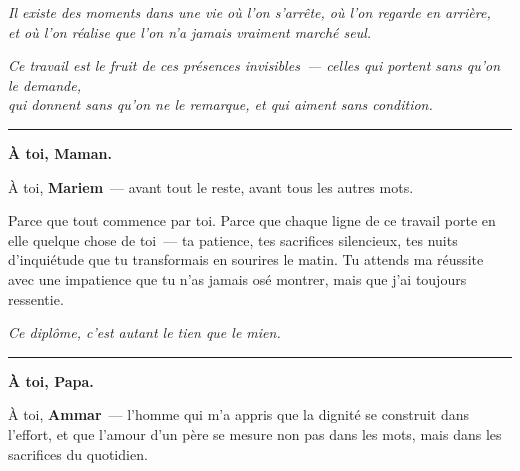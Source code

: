 \begin{center}
\vspace*{1cm}

{\small\itshape
Il existe des moments dans une vie où l'on s'arrête, où l'on regarde en arrière,\\
et où l'on réalise que l'on n'a jamais vraiment marché seul.
}

\vspace{0.4cm}

{\small\itshape
Ce travail est le fruit de ces présences invisibles~--- celles qui portent sans qu'on le demande,\\
qui donnent sans qu'on ne le remarque, et qui aiment sans condition.
}

\vspace{1cm}
\rule{0.4\textwidth}{0.4pt}
\vspace{1cm}

{\large\bfseries À toi, Maman.}

\vspace{0.4cm}

\begin{minipage}{0.75\textwidth}
\centering
À toi, \textbf{Mariem}~--- avant tout le reste, avant tous les autres mots.

\vspace{0.3cm}

Parce que tout commence par toi. Parce que chaque ligne de ce travail porte en elle
quelque chose de toi~--- ta patience, tes sacrifices silencieux, tes nuits d'inquiétude
que tu transformais en sourires le matin. Tu attends ma réussite avec une impatience
que tu n'as jamais osé montrer, mais que j'ai toujours ressentie.

\vspace{0.3cm}

\textit{Ce diplôme, c'est autant le tien que le mien.}
\end{minipage}

\vspace{1cm}
\rule{0.4\textwidth}{0.4pt}
\vspace{1cm}

{\large\bfseries À toi, Papa.}

\vspace{0.4cm}

\begin{minipage}{0.75\textwidth}
\centering
À toi, \textbf{Ammar}~--- l'homme qui m'a appris que la dignité se construit dans l'effort,
et que l'amour d'un père se mesure non pas dans les mots, mais dans les sacrifices du quotidien.


\end{minipage}
\end{center}
